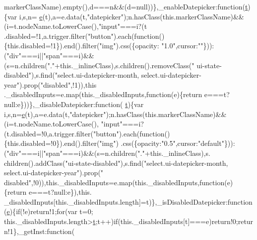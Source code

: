 \begin{DoxyCode}
      markerClassName).empty(),d===n&&(d=null))\},\_enableDatepicker:\textcolor{keyword}{function}(\hyperlink{jquery-2_80_83_8min_8js_aaccc9105df5383111407fd5b41255e23}{t})\{var i,s,n=
      \hyperlink{jquery-ui_8min_8js_a2c038346d47955cbe2cb91e338edd7e1}{e}(t),a=e.data(t,\textcolor{stringliteral}{"datepicker"});n.hasClass(this.markerClassName)&&(i=t.nodeName.toLowerCase(),\textcolor{stringliteral}{"input"}===i?(t
      .disabled=!1,a.trigger.filter(\textcolor{stringliteral}{"button"}).each(\textcolor{keyword}{function}()\{this.disabled=!1\}).end().filter(\textcolor{stringliteral}{"img"}).css(\{opacity:\textcolor{stringliteral}{
      "1.0"},cursor:\textcolor{stringliteral}{""}\})):(\textcolor{stringliteral}{"div"}===i||\textcolor{stringliteral}{"span"}===i)&&(s=n.children(\textcolor{stringliteral}{"."}+this.\_inlineClass),s.children().removeClass(\textcolor{stringliteral}{"
      ui-state-disabled"}),s.find(\textcolor{stringliteral}{"select.ui-datepicker-month, select.ui-datepicker-year"}).prop(\textcolor{stringliteral}{"disabled"},!1)),this
      .\_disabledInputs=e.map(this.\_disabledInputs,function(e)\{\textcolor{keywordflow}{return} e===t?null:e\}))\},\_disableDatepicker:\textcolor{keyword}{function}(
      \hyperlink{jquery-2_80_83_8min_8js_aaccc9105df5383111407fd5b41255e23}{t})\{var i,s,n=\hyperlink{jquery-ui_8min_8js_a2c038346d47955cbe2cb91e338edd7e1}{e}(t),a=e.data(t,\textcolor{stringliteral}{"datepicker"});n.hasClass(this.markerClassName)&&(i=t.nodeName.toLowerCase(),\textcolor{stringliteral}{
      "input"}===i?(t.disabled=!0,a.trigger.filter(\textcolor{stringliteral}{"button"}).each(\textcolor{keyword}{function}()\{this.disabled=!0\}).end().filter(\textcolor{stringliteral}{"img"})
      .css(\{opacity:\textcolor{stringliteral}{"0.5"},cursor:\textcolor{stringliteral}{"default"}\})):(\textcolor{stringliteral}{"div"}===i||\textcolor{stringliteral}{"span"}===i)&&(s=n.children(\textcolor{stringliteral}{"."}+this.\_inlineClass),s.
      children().addClass(\textcolor{stringliteral}{"ui-state-disabled"}),s.find(\textcolor{stringliteral}{"select.ui-datepicker-month, select.ui-datepicker-year"}).prop(\textcolor{stringliteral}{"
      disabled"},!0)),this.\_disabledInputs=e.map(this.\_disabledInputs,function(e)\{\textcolor{keywordflow}{return} e===t?null:e\}),this.
      \_disabledInputs[this.\_disabledInputs.length]=t)\},\_isDisabledDatepicker:\textcolor{keyword}{function}(\hyperlink{jquery-ui_8min_8js_a2c038346d47955cbe2cb91e338edd7e1}{e})\{\textcolor{keywordflow}{if}(!e)\textcolor{keywordflow}{return}!1;\textcolor{keywordflow}{for}(var t=0;
      this.\_disabledInputs.length>\hyperlink{jquery-2_80_83_8min_8js_aaccc9105df5383111407fd5b41255e23}{t};t++)\textcolor{keywordflow}{if}(this.\_disabledInputs[t]===e)\textcolor{keywordflow}{return}!0;\textcolor{keywordflow}{return}!1\},\_getInst:\textcolor{keyword}{function}(

\end{DoxyCode}
